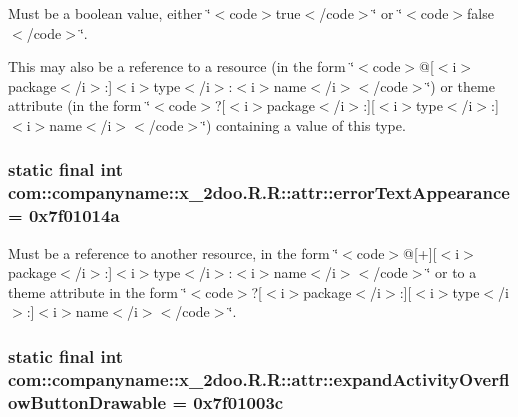 Must be a boolean value, either \char`\"{}$<$code$>$true$<$/code$>$\char`\"{} or \char`\"{}$<$code$>$false$<$/code$>$\char`\"{}. 

This may also be a reference to a resource (in the form \char`\"{}$<$code$>$@\mbox{[}$<$i$>$package$<$/i$>$:\mbox{]}$<$i$>$type$<$/i$>$:$<$i$>$name$<$/i$>$$<$/code$>$\char`\"{}) or theme attribute (in the form \char`\"{}$<$code$>$?\mbox{[}$<$i$>$package$<$/i$>$:\mbox{]}\mbox{[}$<$i$>$type$<$/i$>$:\mbox{]}$<$i$>$name$<$/i$>$$<$/code$>$\char`\"{}) containing a value of this type. \hypertarget{classcom_1_1companyname_1_1x__2doo_1_1_r_1_1attr_4ee123561bac53425997f3cf3edbf9e1}{
\subsubsection[{errorTextAppearance}]{\setlength{\rightskip}{0pt plus 5cm}static final int com::companyname::x\_\-2doo.R.R::attr::errorTextAppearance = 0x7f01014a}}
\label{classcom_1_1companyname_1_1x__2doo_1_1_r_1_1attr_4ee123561bac53425997f3cf3edbf9e1}


Must be a reference to another resource, in the form \char`\"{}$<$code$>$@\mbox{[}+\mbox{]}\mbox{[}$<$i$>$package$<$/i$>$:\mbox{]}$<$i$>$type$<$/i$>$:$<$i$>$name$<$/i$>$$<$/code$>$\char`\"{} or to a theme attribute in the form \char`\"{}$<$code$>$?\mbox{[}$<$i$>$package$<$/i$>$:\mbox{]}\mbox{[}$<$i$>$type$<$/i$>$:\mbox{]}$<$i$>$name$<$/i$>$$<$/code$>$\char`\"{}. \hypertarget{classcom_1_1companyname_1_1x__2doo_1_1_r_1_1attr_7b3a130b57219e16909ff5f27586013c}{
\subsubsection[{expandActivityOverflowButtonDrawable}]{\setlength{\rightskip}{0pt plus 5cm}static final int com::companyname::x\_\-2doo.R.R::attr::expandActivityOverflowButtonDrawable = 0x7f01003c}}
\label{classcom_1_1companyname_1_1x__2doo_1_1_r_1_1attr_7b3a130b57219e16909ff5f27586013c}


